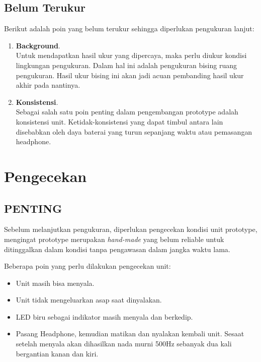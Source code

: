 \documentclass[12pt,]{article}
\begin{document}
	\newpage
	\subsection{Belum Terukur}
	
	Berikut adalah poin yang belum terukur sehingga diperlukan pengukuran lanjut:
	\begin{enumerate}
		\item \textbf{Background}.\\
		Untuk mendapatkan hasil ukur yang dipercaya, maka perlu diukur kondisi lingkungan pengukuran.
		Dalam hal ini adalah pengukuran bising ruang pengukuran.
		Hasil ukur bising ini akan jadi acuan pembanding hasil ukur akhir pada nantinya.
		
		\item \textbf{Konsistensi}.\\
		Sebagai salah satu poin penting dalam pengembangan prototype adalah konsistensi unit.
		Ketidak-konsistensi yang dapat timbul antara lain disebabkan oleh daya baterai yang turun sepanjang waktu
		atau pemasangan headphone.
	\end{enumerate}

	\newpage
	\section{Pengecekan}
	
	\subsection{PENTING}
	
	Sebelum melanjutkan pengukuran, diperlukan pengecekan kondisi unit prototype,
	mengingat prototype merupakan \textit{hand-made} yang belum reliable untuk ditinggalkan dalam
	kondisi tanpa pengawasan dalam jangka waktu lama.
	
	Beberapa poin yang perlu dilakukan pengecekan unit:
	\begin{itemize}
		\item Unit masih bisa menyala.
		\item Unit tidak mengeluarkan asap saat dinyalakan.
		\item LED biru sebagai indikator masih menyala dan berkedip.
		\item Pasang Headphone, kemudian matikan dan nyalakan kembali unit. Sesaat setelah menyala
		akan dihasilkan nada murni 500Hz sebanyak dua kali bergantian kanan dan kiri.
	\end{itemize}
	
\end{document}
